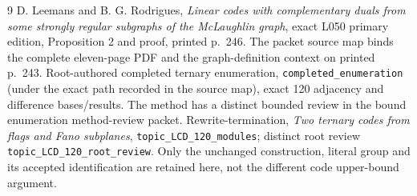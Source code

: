 \documentclass[11pt]{article}
\begin{document}
\begin{thebibliography}{9}
 D. Leemans and B. G. Rodrigues, \emph{Linear codes with complementary duals from some strongly regular subgraphs of the McLaughlin graph}, exact L050 primary edition, Proposition 2 and proof, printed p.\ 246. The packet source map binds the complete eleven-page PDF and the graph-definition context on printed p.\ 243.
 Root-authored completed ternary enumeration, \texttt{completed\_enumeration} (under the exact path recorded in the source map), exact 120 adjacency and difference bases/results. The method has a distinct bounded review in the bound enumeration method-review packet.
 Rewrite-termination, \emph{Two ternary codes from flags and Fano subplanes}, \texttt{topic\_LCD\_120\_modules}; distinct root review \texttt{topic\_LCD\_120\_root\_review}. Only the unchanged construction, literal group and its accepted identification are retained here, not the different code upper-bound argument.
\end{thebibliography}
\end{document}
